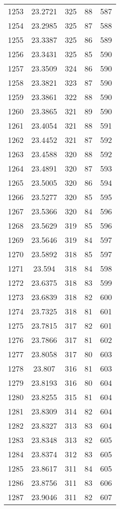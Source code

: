 \documentclass[12pt,a4paper]{article}
\begin{document}
\begin{tabular}{r|cccc}
	1253 & 23.2721 & 325 & 88 & 587 \\
	1254 & 23.2985 & 325 & 87 & 588 \\
	1255 & 23.3387 & 325 & 86 & 589 \\
	1256 & 23.3431 & 325 & 85 & 590 \\
	1257 & 23.3509 & 324 & 86 & 590 \\
	1258 & 23.3821 & 323 & 87 & 590 \\
	1259 & 23.3861 & 322 & 88 & 590 \\
	1260 & 23.3865 & 321 & 89 & 590 \\
	1261 & 23.4054 & 321 & 88 & 591 \\
	1262 & 23.4452 & 321 & 87 & 592 \\
	1263 & 23.4588 & 320 & 88 & 592 \\
	1264 & 23.4891 & 320 & 87 & 593 \\
	1265 & 23.5005 & 320 & 86 & 594 \\
	1266 & 23.5277 & 320 & 85 & 595 \\
	1267 & 23.5366 & 320 & 84 & 596 \\
	1268 & 23.5629 & 319 & 85 & 596 \\
	1269 & 23.5646 & 319 & 84 & 597 \\
	1270 & 23.5892 & 318 & 85 & 597 \\
	1271 & 23.594 & 318 & 84 & 598 \\
	1272 & 23.6375 & 318 & 83 & 599 \\
	1273 & 23.6839 & 318 & 82 & 600 \\
	1274 & 23.7325 & 318 & 81 & 601 \\
	1275 & 23.7815 & 317 & 82 & 601 \\
	1276 & 23.7866 & 317 & 81 & 602 \\
	1277 & 23.8058 & 317 & 80 & 603 \\
	1278 & 23.807 & 316 & 81 & 603 \\
	1279 & 23.8193 & 316 & 80 & 604 \\
	1280 & 23.8255 & 315 & 81 & 604 \\
	1281 & 23.8309 & 314 & 82 & 604 \\
	1282 & 23.8327 & 313 & 83 & 604 \\
	1283 & 23.8348 & 313 & 82 & 605 \\
	1284 & 23.8374 & 312 & 83 & 605 \\
	1285 & 23.8617 & 311 & 84 & 605 \\
	1286 & 23.8756 & 311 & 83 & 606 \\
	1287 & 23.9046 & 311 & 82 & 607 \\

\end{tabular}
\end{document}
